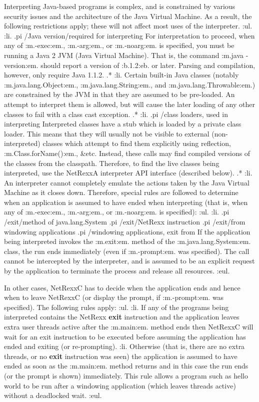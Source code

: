 Interpreting Java-based programs is complex, and is constrained by
various security issues and the architecture of the Java Virtual
Machine.  As a result, the following restrictions apply; these will
not affect most uses of the interpreter.
:ul.
:li.
.pi /Java version/required for interpreting
For interpretation to proceed, when any of :m.-exec:em., :m.-arg:em.,
or :m.-noarg:em. is specified, you must be running a Java 2 JVM (Java
Virtual Machine).
That is, the command :m.java -version:em. should report a version
of :b.1.2:eb. or later.  Parsing and compilation, however, only require
Java 1.1.2.
.*
:li.
Certain built-in Java classes
(notably :m.java.lang.Object:em., :m.java.lang.String:em.,
and :m.java.lang.Throwable:em.) are constrained by the JVM in that they
are assumed to be pre-loaded.  An attempt to interpret them is allowed,
but will cause the later loading of any other classes to fail with a
class cast exception.
.*
:li.
.pi /class loaders, used in interpreting
Interpreted classes have a stub which is loaded by a private class
loader.  This means that they will usually not be visible to external
(non-interpreted) classes which attempt to find them explicitly using
reflection, :m.Class.forName():em., &etc.  Instead, these calls may find
compiled versions of the classes from the classpath.  Therefore, to find
the live classes being interpreted, use the NetRexxA interpreter
API interface (described below).
.*
:li.
An interpreter cannot completely emulate the actions taken by the Java
Virtual Machine as it closes down.  Therefore, special rules are
followed to determine when an application is assumed to have ended when
interpreting (that is, when any of :m.-exec:em., :m.-arg:em.,
or :m.-noarg:em. is specified):
:ul.
:li.
.pi /exit/method of java.lang.System
.pi /exit/NetRexx instruction
.pi /exit/from windowing applications
.pi /windowing applications, exit from
If the application being interpreted invokes the :m.exit:em. method of
the :m.java.lang.System:em. class, the run ends immediately (even
if :m.-prompt:em. was specified).  The call cannot be intercepted by the
interpreter, and is assumed to be an explicit request by the application
to terminate the process and release all resources.
:eul.

In other cases, NetRexxC has to decide when the application ends and
hence when to leave NetRexxC (or display the prompt, if :m.-prompt:em.
was specified).  The following rules apply:
:ul.
:li.
If any of the programs being interpreted contains the NetRexx
\textbf{exit} instruction and the application leaves extra user threads
active after the :m.main:em. method ends then NetRexxC will wait for an
exit instruction to be executed before assuming the application has
ended and exiting (or re-prompting).
:li.
Otherwise (that is, there are no extra threads, or no \textbf{exit}
instruction was seen) the application is assumed to have ended as soon
as the :m.main:em. method returns and in this case the run ends (or the
prompt is shown) immediately.  This rule allows a program such as
hello world to be run after a windowing application (which leaves
threads active) without a deadlocked wait.
:eul.

